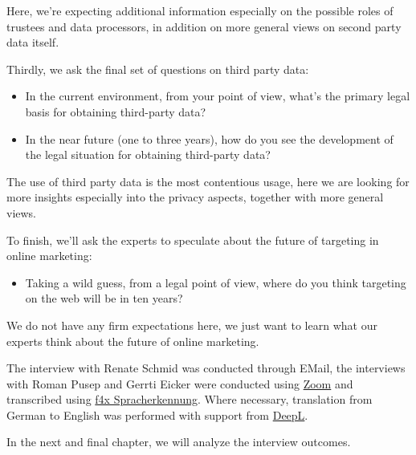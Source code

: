 Here, we're expecting additional information especially on the possible roles of trustees and data processors, in addition on more general views on second party data itself.
 
Thirdly, we ask the final set of questions on third party data:

\begin{itemize} 
 \item In the current environment, from your point of view, what's the primary legal basis for obtaining third-party data?
 \item In the near future (one to three years), how do you see the development of the legal situation for obtaining third-party data?
\end{itemize} 
 
The use of third party data is the most contentious usage, here we are looking for more insights especially into the privacy aspects, together with more general views.

To finish, we'll ask the experts to speculate about the future of targeting in online marketing:
 
\begin{itemize} 
 \item Taking a wild guess, from a legal point of view, where do you think targeting on the web will be in ten years?
\end{itemize}

We do not have any firm expectations here, we just want to learn what our experts think about the future of online marketing.

The interview with Renate Schmid was conducted through EMail, the interviews with Roman Pusep and Gerrti Eicker were conducted using \href{https://zoom.us/}{Zoom} and transcribed using \href{https://f4x.audiotranskription.de/}{f4x Spracherkennung}. Where necessary, translation from German to English was performed with support from \href{https://www.deepl.com/en/translator}{DeepL}.

In the next and final chapter, we will analyze the interview outcomes.
